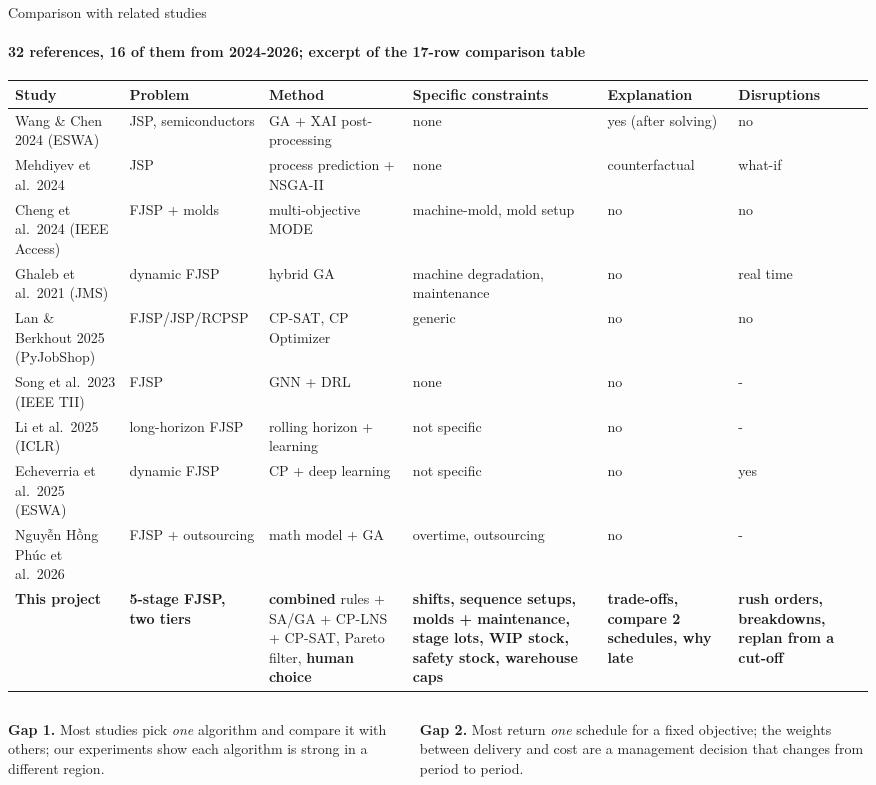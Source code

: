 \begin{frame}{Comparison with related studies}
\framesubtitle{32 references, 16 of them from 2024-2026; excerpt of the 17-row comparison table}
\centering\tiny
\setlength{\tabcolsep}{3pt}
\renewcommand{\arraystretch}{1.08}
\begin{tabular}{@{}L{2.95cm}L{1.9cm}L{2.85cm}L{2.85cm}L{1.55cm}L{1.45cm}@{}}
\toprule
Study & Problem & Method & Specific constraints & Explanation & Disruptions\\
\midrule
Wang \& Chen 2024 (ESWA) & JSP, semiconductors & GA + XAI post-processing & none & yes (after solving) & no\\
Mehdiyev et al.\ 2024 & JSP & process prediction + NSGA-II & none & counterfactual & what-if\\
Cheng et al.\ 2024 (IEEE Access) & FJSP + molds & multi-objective MODE & machine-mold, mold setup & no & no\\
Ghaleb et al.\ 2021 (JMS) & dynamic FJSP & hybrid GA & machine degradation, maintenance & no & real time\\
Lan \& Berkhout 2025 (PyJobShop) & FJSP/JSP/RCPSP & CP-SAT, CP Optimizer & generic & no & no\\
Song et al.\ 2023 (IEEE TII) & FJSP & GNN + DRL & none & no & -\\
Li et al.\ 2025 (ICLR) & long-horizon FJSP & rolling horizon + learning & not specific & no & -\\
Echeverria et al.\ 2025 (ESWA) & dynamic FJSP & CP + deep learning & not specific & no & yes\\
Nguyễn Hồng Phúc et al.\ 2026 & FJSP + outsourcing & math model + GA & overtime, outsourcing & no & -\\
\midrule
\textbf{This project} & \textbf{5-stage FJSP, two tiers} & \textbf{combined} rules + SA/GA + CP-LNS + CP-SAT, Pareto filter, \textbf{human choice} &
  \textbf{shifts, sequence setups, molds + maintenance, stage lots, WIP stock, safety stock, warehouse caps} &
  \textbf{trade-offs, compare 2 schedules, why late} & \textbf{rush orders, breakdowns, replan from a cut-off}\\
\bottomrule
\end{tabular}
\vspace{0.5em}

\begin{columns}[T]
\begin{column}{0.48\textwidth}
\scriptsize \textbf{Gap 1.} Most studies pick \emph{one} algorithm and compare it with others;
our experiments show each algorithm is strong in a different region.
\end{column}
\begin{column}{0.48\textwidth}
\scriptsize \textbf{Gap 2.} Most return \emph{one} schedule for a fixed objective; the weights between delivery and
cost are a management decision that changes from period to period.
\end{column}
\end{columns}
\end{frame}

